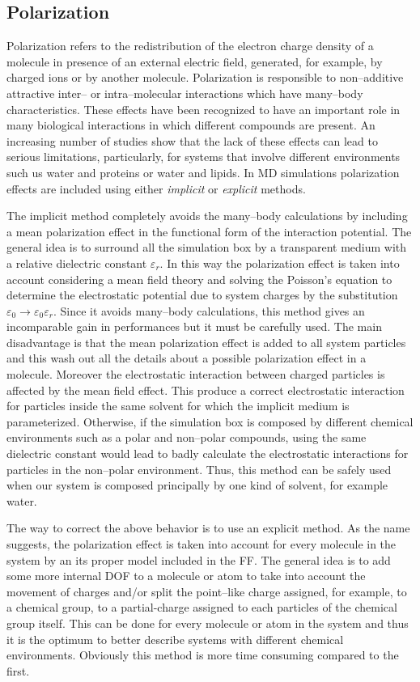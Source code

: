 \subsection{Polarization}
\label{sec:polarization}
Polarization refers to the redistribution of the electron charge density of a molecule in presence of an external
electric field, generated, for example, by charged ions or by another molecule. Polarization is responsible to
non--additive attractive inter-- or intra--molecular interactions which have many--body characteristics. These
effects have been recognized to have an important role in many biological interactions in which different
compounds are present. An increasing number of studies show that the lack of these effects can lead to serious
limitations, particularly, for systems that involve different environments such us water and proteins or water
and lipids. In \ac{MD} simulations polarization effects are included using either \textit{implicit} or
\textit{explicit} methods.

The implicit method completely avoids the many--body calculations by including a mean polarization effect in the
functional form of the interaction potential. The general idea is to surround all the simulation box by a
transparent medium with a relative dielectric constant $\varepsilon_r$. In this way the polarization effect is
taken into account considering a mean field theory and solving the Poisson's equation to determine the
electrostatic potential due to system charges by the substitution
$\varepsilon_0\rightarrow\varepsilon_0\varepsilon_r$. Since it avoids many--body calculations, this method gives
an incomparable gain in performances but it must be carefully used. The main disadvantage is that the mean
polarization effect is added to all system particles and this wash out all the details about a possible
polarization effect in a molecule. Moreover the electrostatic interaction between charged particles is affected
by the mean field effect. This produce a correct electrostatic interaction for particles inside the same solvent
for which the implicit medium is parameterized. Otherwise, if the simulation box is composed by different
chemical environments such as a polar and non--polar compounds, using the same dielectric constant would lead to
badly calculate the electrostatic interactions for particles in the non--polar environment. Thus, this method can
be safely used when our system is composed principally by one kind of solvent, for example water.

The way to correct the above behavior is to use an explicit method. As the name suggests, the polarization effect
is taken into account for every molecule in the system by an its proper model included in the \ac{FF}. The
general idea is to add some more internal \ac{DOF} to a molecule or atom to take into account the movement of
charges and/or split the point--like charge assigned, for example, to a chemical group, to a partial-charge
assigned to each particles of the chemical group itself. This can be done for every molecule or atom in the
system and thus it is the optimum to better describe systems with different chemical environments. Obviously this
method is more time consuming compared to the first.

